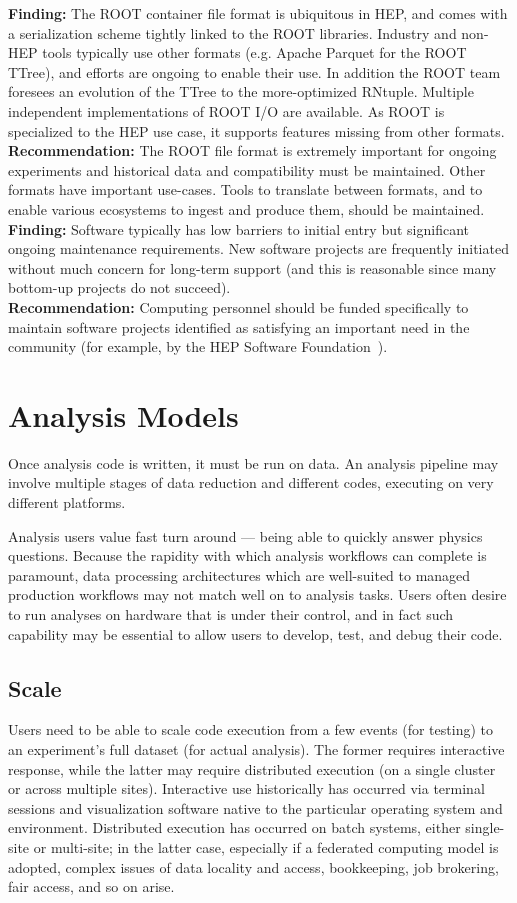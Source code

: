 \textbf{Finding:} The ROOT container file format is ubiquitous in HEP, and comes with a serialization scheme tightly linked to the ROOT libraries. Industry and non-HEP tools typically use other formats (e.g. Apache Parquet for the ROOT TTree), and efforts are ongoing to enable their use. In addition the ROOT team foresees an evolution of the TTree to the more-optimized RNtuple. Multiple independent implementations of ROOT I/O are available. As ROOT is specialized to the HEP use case, it supports features missing from other formats.\\
\textbf{Recommendation:} The ROOT file format is extremely important for ongoing experiments and historical data and compatibility must be maintained. Other formats have important use-cases. Tools to translate between formats, and to enable various ecosystems to ingest and produce them, should be maintained.\\

\textbf{Finding:} Software typically has low barriers to initial entry but significant ongoing maintenance requirements. New software projects are frequently initiated without much concern for long-term support (and this is reasonable since many bottom-up projects do not succeed).\\
\textbf{Recommendation:} Computing personnel should be funded specifically to maintain software projects identified as satisfying an important need in the community (for example, by the HEP Software Foundation~\cite{HSF}). 


\section{Analysis Models}
Once analysis code is written, it must be run on data. An analysis pipeline may involve multiple stages of data reduction and different codes, executing on very different platforms.

Analysis users value fast turn around --- being able to quickly answer physics questions. Because the rapidity with which analysis workflows can complete is paramount, data processing architectures which are well-suited to managed production workflows may not match well on to analysis tasks. Users often desire to run analyses on hardware that is under their control, and in fact such capability may be essential to allow users to develop, test, and debug their code. 

\subsection{Scale}
Users need to be able to scale code execution from a few events (for testing) to an experiment's full dataset (for actual analysis). The former requires interactive response, while the latter may require distributed execution (on a single cluster or across multiple sites). Interactive use historically has occurred via terminal sessions and visualization software native to the particular operating system and environment. Distributed execution has occurred on batch systems, either single-site or multi-site; in the latter case, especially if a federated computing model is adopted, complex issues of data locality and access, bookkeeping, job brokering, fair access, and so on arise.

